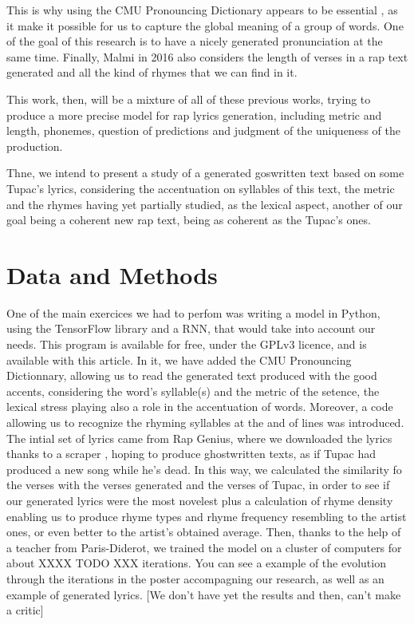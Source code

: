 \documentclass[12pt,a4paper]{article}
\begin{document}
This is why using the CMU Pronouncing Dictionary appears to be essential \cite{hirjee_using_2010}, as it make it possible for us to capture the global meaning of a group of words. One of the goal of this research is to have a nicely generated pronunciation at the same time. Finally, Malmi in 2016 also considers the length of verses in a rap text generated and all the kind of rhymes that we can find in it. \newline

This work, then, will be a mixture of all of these previous works, trying to produce a more precise model for rap lyrics generation, including metric and length, phonemes, question of predictions and judgment of the uniqueness of the production. 

Thne, we intend to present a study of a generated goswritten text based on some Tupac's lyrics, considering the accentuation on syllables of this text, the metric and the rhymes having yet partially studied, as the lexical aspect, another of our goal being a coherent new rap text, being as coherent as the Tupac's ones. \newline

\section{Data and Methods}

One of the main exercices we had to perfom was writing a model in Python, using the TensorFlow library and a RNN, that would take into account our needs.  This program is available for free, under the GPLv3 licence, and is available with this article. In it, we have added the CMU Pronouncing Dictionnary, allowing us to read the generated text produced with the good accents, considering the word's syllable(s) and the metric of the setence, the lexical stress playing also a role in the accentuation of words. Moreover, a code allowing us to recognize the rhyming syllables at the and of lines was introduced. The intial set of lyrics came from Rap Genius, where we downloaded the lyrics thanks to a scraper \cite{paupier_raplyrics-scraper_2018}, hoping to produce ghostwritten texts, as if Tupac had produced a new song while he's dead. In this way, we calculated the similarity fo the verses with the verses generated and the verses of Tupac, in order to see if our generated lyrics were the most novelest plus a calculation of rhyme density enabling us to produce rhyme types and rhyme frequency resembling to the artist ones, or even better to the artist’s obtained average. Then, thanks to the help of a teacher from Paris-Diderot, we trained the model on a cluster of computers for about XXXX TODO XXX iterations. You can see a example of the evolution through the iterations in the poster accompagning our research, as well as an example of generated lyrics. [We don't have yet the results and then, can't make a critic]



\end{document}
